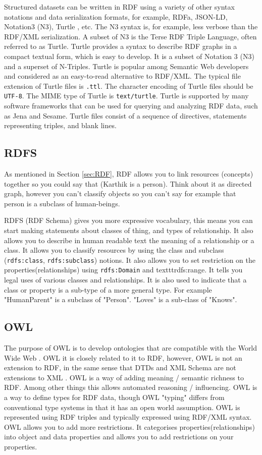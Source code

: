 Structured datasets can be written in RDF using a variety of other syntax notations and data serialization formats, for example, RDFa, JSON-LD, Notation3 (N3), Turtle \cite{rdfTurtle}, etc. The N3 syntax is, for example, less verbose than the RDF/XML serialization. A subset of N3 is the Terse RDF Triple Language, often referred to as Turtle. Turtle provides a syntax to describe RDF graphs in a compact textual form, which is easy to develop. It is a subset of Notation 3 (N3) and a superset of N-Triples. Turtle is popular among Semantic Web developers and considered as an easy-to-read alternative to RDF/XML. The typical file extension of Turtle files is \texttt{.ttl}. The character encoding of Turtle files should be \texttt{UTF-8}. The MIME type of Turtle is \texttt{text/turtle}. Turtle is supported by many software frameworks that can be used for querying and analyzing RDF data, such as Jena and Sesame. Turtle files consist of a sequence of directives, statements representing triples, and blank lines.

\subsection{RDFS}
As mentioned in Section \ref{sec:RDF}, RDF allows you to link resources (concepts) together so you could say that (Karthik  is a person). Think about it as directed graph, however you can't classify objects so you can't say for example that person is a subclass of human-beings.

RDFS (RDF Schema) gives you more expressive vocabulary, this means you can start making statements about classes of thing, and types of relationship. It also allows you to describe in human readable text the meaning of a relationship or a class.
It allows you to classify resources by using the class and subclass (\texttt{rdfs:class}, \texttt{rdfs:subclass}) notions. It also allows you to set restriction on the properties(relationships) using \texttt{rdfs:Domain} and texttt{rdfs:range}.
It tells you legal uses of various classes and relationships. It is also used to indicate that a class or property is a sub-type of a more general type. For example "HumanParent" is a subclass of "Person". "Loves" is a sub-class of "Knows"\cite{RDFvsOWL_SO}.

\subsection{OWL}
The purpose of OWL is to develop ontologies that are compatible with the World Wide Web \cite{RDFandOWL_SenmanticWebAffinityGroup}.
OWL it is closely related to it to RDF, however, OWL is not an extension to RDF, in the same sense that DTDs and XML Schema are not extensions to XML \cite{RDFvsOWLquora}. 
OWL is a way of adding meaning / semantic richness to RDF.  Among other things this allows automated reasoning / influencing.
OWL is a way to define types for RDF data, though OWL "typing"  differs from conventional type systems in that it has an open world  assumption. OWL is represented using RDF triples and typically expressed using RDF/XML syntax.
OWL allows you to add more restrictions. It categorises properties(relationships) into object and data properties and allows you to add restrictions on your properties.


